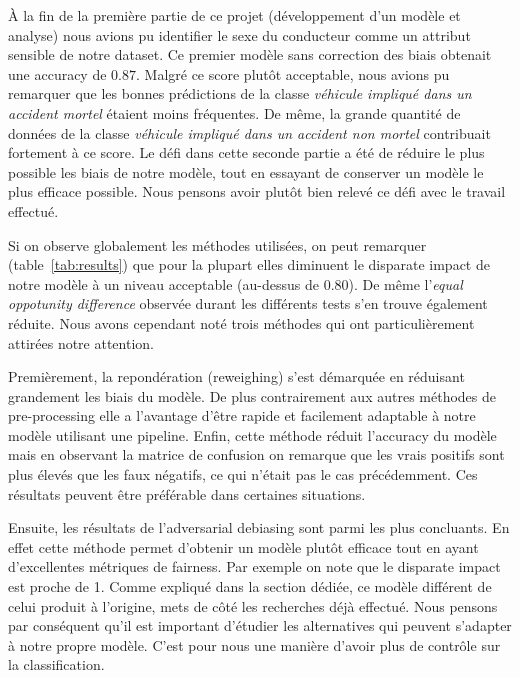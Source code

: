 \documentclass{article}
\begin{document}
    À la fin de la première partie de ce projet (développement d'un modèle et analyse) nous avions pu 
    identifier le sexe du conducteur comme un attribut sensible de notre dataset. Ce premier modèle 
    sans correction des biais obtenait une accuracy de $0.87$. Malgré ce score plutôt acceptable, nous 
    avions pu remarquer que les bonnes prédictions de la classe \textit{véhicule impliqué dans un accident 
    mortel} étaient moins fréquentes.
    De même, la grande quantité de données de la classe \textit{véhicule impliqué dans un accident 
    non mortel} contribuait fortement à ce score. 
    Le défi dans cette seconde partie a été de réduire le plus possible les biais de notre modèle, tout 
    en essayant de conserver un modèle le plus efficace possible. Nous pensons avoir plutôt bien relevé ce 
    défi avec le travail effectué.

    Si on observe globalement les méthodes utilisées, on peut remarquer (table~\ref{tab:results}) que pour la plupart elles 
    diminuent le disparate impact de notre modèle à un niveau acceptable (au-dessus de 0.80). De même l'\textit{equal 
    oppotunity difference} observée durant les différents tests s'en trouve également réduite. 
    Nous avons cependant noté trois méthodes qui ont particulièrement attirées notre attention.

    Premièrement, la repondération (reweighing) s'est démarquée en réduisant grandement les biais du modèle. 
    De plus contrairement aux autres méthodes de 
    pre-processing elle a l'avantage d'être rapide et facilement adaptable à notre modèle utilisant une 
    pipeline. Enfin, cette méthode réduit l'accuracy du modèle mais en observant la matrice de confusion 
    on remarque que les vrais positifs sont plus élevés que les faux négatifs, 
    ce qui n'était pas le cas précédemment. Ces résultats peuvent être préférable dans certaines situations.

    Ensuite, les résultats de l'adversarial debiasing sont parmi les plus concluants. En effet cette 
    méthode permet d'obtenir un modèle plutôt efficace tout en ayant d'excellentes métriques de fairness. 
    Par exemple on note que le disparate impact est proche de 1. Comme expliqué dans la section dédiée, ce 
    modèle différent de celui produit à l'origine, mets de côté les recherches déjà effectué. Nous pensons par
     conséquent qu'il est important d'étudier les alternatives qui peuvent s'adapter à notre propre modèle.
    C'est pour nous une manière d'avoir plus de contrôle sur la classification.
\end{document}
